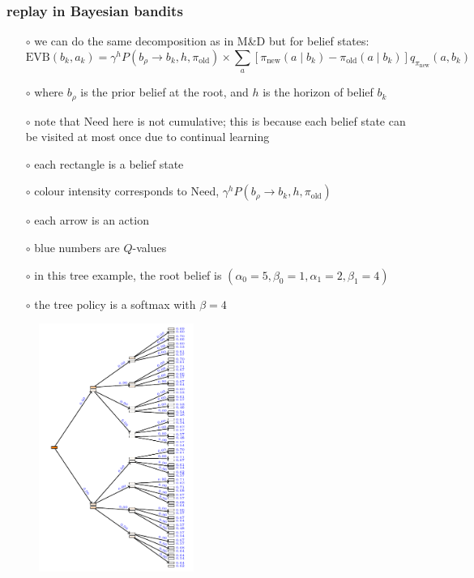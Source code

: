 \documentclass[aspectratio=169]{beamer}
\newcommand{\old}{\text{old}}
\newcommand{\new}{\text{new}}
\begin{document}
\begin{frame}
    \frametitle{replay in Bayesian bandits}
    \begin{itemize}
        \item[$\circ$] we can do the same decomposition as in M\&D but for belief states:
        $$ \text{EVB}(b_k, a_k) = \gamma^h P(b_\rho \rightarrow b_k, h, \pi_\old) \times \sum_a [\pi_\new (a\mid b_k) - \pi_\old (a\mid b_k)]q_{\pi_\new}(a, b_k) $$ 
        \item[$\circ$] where $b_\rho$ is the prior belief at the root, and $h$ is the horizon of belief $b_k$
        \item[$\circ$] note that Need here is not cumulative; this is because each belief state can be visited at most once due to continual learning
    \end{itemize}
\end{frame}

\begin{landscape}
    \begin{frame}
        \begin{itemize}
            \item[$\circ$] each rectangle is a belief state 
            \item[$\circ$] colour intensity corresponds to Need, $\gamma^h P(b_\rho \rightarrow b_k, h, \pi_\old)$
            \item[$\circ$] each arrow is an action
            \item[$\circ$] blue numbers are $Q$-values 
            \item[$\circ$] in this tree example, the root belief is $(\alpha_0=5, \beta_0=1, \alpha_1=2, \beta_1=4)$
            \item[$\circ$] the tree policy is a softmax with $\beta=4$ 
        \end{itemize}
        \begin{figure}
            \includegraphics[width=0.45\textwidth]{trees/1/tex_tree_0.pdf}
        \end{figure}
    \end{frame}
\end{landscape}
\end{document}
